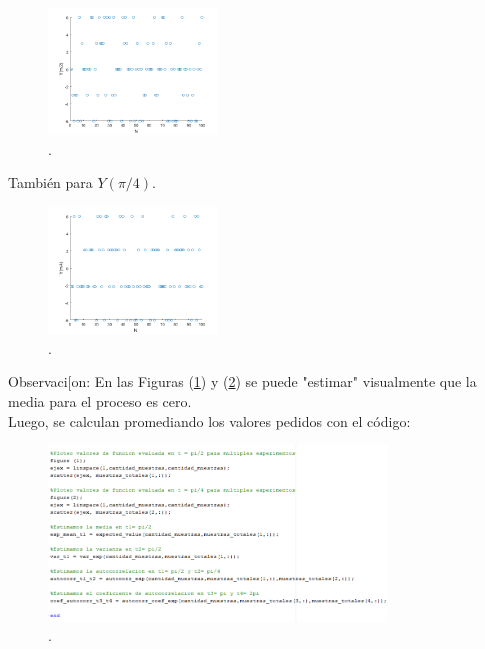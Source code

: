 \begin{figure}[H]
\centering
	\includegraphics[width=0.4\textwidth, trim = {0 0 0 0},clip]{./ImagenesEjercicio1/ypi_2.png}
	\caption{.}
	\label{fig:ypi_2}
\end{figure}

También para $Y(\pi/4)$.

\begin{figure}[H]
\centering
	\includegraphics[width=0.4\textwidth, trim = {0 0 0 0},clip]{./ImagenesEjercicio1/ypi_4.png}
	\caption{.}
	\label{fig:ypi_4}
\end{figure}

Observaci[on: En las Figuras (\ref{fig:ypi_2}) y (\ref{fig:ypi_4}) se puede "estimar" visualmente que la media para el proceso es cero. 
\\
Luego, se calculan promediando los valores pedidos con el código:

\begin{figure}[H]
\centering
	\includegraphics[width=0.8\textwidth, trim = {0 0 0 0},clip]{./ImagenesEjercicio1/main2.png}
	\caption{.}
	\label{fig:main2}
\end{figure}

